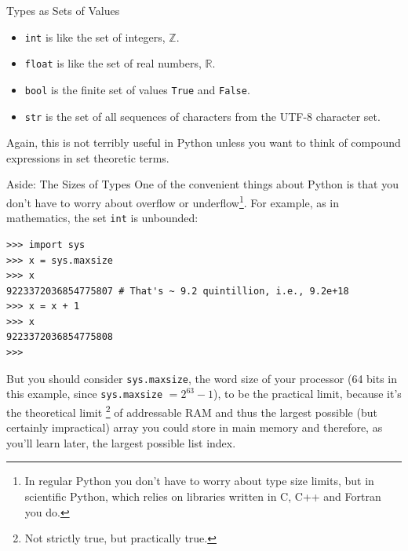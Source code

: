 \documentclass[smaller, aspectratio=1610]{beamer}
\begin{document}
\begin{frame}[label={sec:org26235da},fragile]{Types as Sets of Values}
 \begin{itemize}
\item \texttt{int} is like the set of integers, \(\mathbb{Z}\).
\item \texttt{float} is like the set of real numbers, \(\mathbb{R}\).
\item \texttt{bool} is the finite set of values \texttt{True} and \texttt{False}.
\item \texttt{str} is the set of all sequences of characters from the UTF-8 character set.
\end{itemize}

Again, this is not terribly useful in Python unless you want to think of compound expressions in set theoretic terms.
\end{frame}

\begin{frame}[label={sec:org4a7bb93},fragile]{Aside: The Sizes of Types}
 One of the convenient things about Python is that you don't have to worry about overflow or underflow\footnote{In regular Python you don't have to worry about type size limits, but in scientific Python, which relies on libraries written in C, C++ and Fortran you do.}. For example, as in mathematics, the set \texttt{int} is unbounded:

\lstset{language=Python,label= ,caption= ,captionpos=b,numbers=none}
\begin{lstlisting}
>>> import sys
>>> x = sys.maxsize
>>> x
9223372036854775807 # That's ~ 9.2 quintillion, i.e., 9.2e+18
>>> x = x + 1
>>> x
9223372036854775808
>>>
\end{lstlisting}

But you should consider \texttt{sys.maxsize}, the word size of your processor (64 bits in this example, since \texttt{sys.maxsize} \(= 2^{63} - 1\)), to be the practical limit, because it's the theoretical limit \footnote{Not strictly true, but practically true.} of addressable RAM and thus the largest possible (but certainly impractical) array you could store in main memory and therefore, as you'll learn later, the largest possible list index.
\end{frame}
\end{document}
